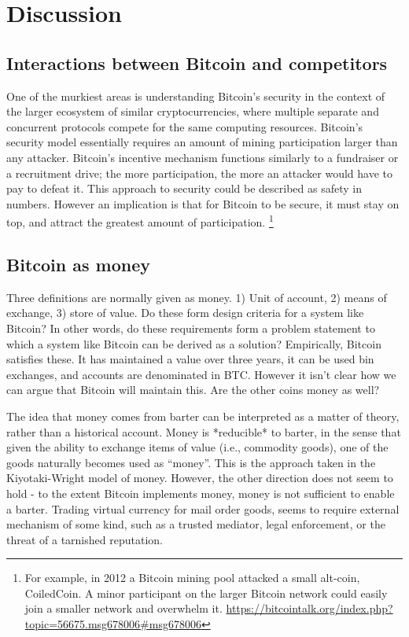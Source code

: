 \section{Discussion}

\subsection{Interactions between Bitcoin and competitors}
One of the murkiest areas is understanding Bitcoin's security in the context of the larger ecosystem of similar cryptocurrencies, where multiple separate and concurrent protocols compete for the same computing resources. Bitcoin's security model essentially requires an amount of mining participation larger than any attacker. Bitcoin's incentive mechanism functions similarly to a fundraiser or a recruitment drive; the more participation, the more an attacker would have to pay to defeat it. This approach to security could be described as safety in numbers. However an implication is that for Bitcoin to be secure, it must stay on top, and attract the greatest amount of participation. \footnote{For example, in 2012 a Bitcoin mining pool attacked a small alt-coin, CoiledCoin. A minor participant on the larger Bitcoin network could easily join a smaller network and overwhelm it. \url{https://bitcointalk.org/index.php?topic=56675.msg678006#msg678006}}

\subsection{Bitcoin as money}
Three definitions are normally given as money. 1) Unit of account, 2) means of exchange, 3) store of value. Do these form design criteria for a system like Bitcoin? In other words, do these requirements form a problem statement to which a system like Bitcoin can be derived as a solution? Empirically, Bitcoin satisfies these. It has maintained a value over three years, it can be used bin exchanges, and accounts are denominated in BTC. However it isn't clear how we can argue that Bitcoin will maintain this. Are the other coins money as well?

The idea that money comes from barter can be interpreted as a matter of theory, rather than a historical account. Money is *reducible* to barter, in the sense that given the ability to exchange items of value (i.e., commodity goods), one of the goods naturally becomes used as ``money''. This is the approach taken in the Kiyotaki-Wright model of money. However, the other direction does not seem to hold - to the extent Bitcoin implements money, money is not sufficient to enable a barter. Trading virtual currency for mail order goods, seems to require  external mechanism of some kind, such as a trusted mediator, legal enforcement, or the threat of a tarnished reputation.

